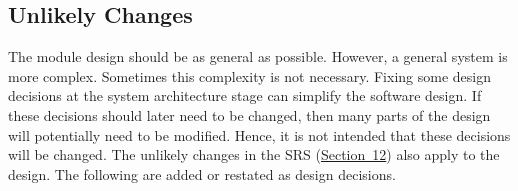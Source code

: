 \documentclass[10pt, titlepage]{article}
\newcommand{\srsurl}{https://team-hindsight.github.io/ophthamology-game/SRS/SRS.pdf}
\newcommand{\srsitemref}[2]{\href{\srsurl\#nameddest=#1}{#2}}
\begin{document}
\subsection{Unlikely Changes} \label{SecUchange}

The module design should be as general as possible. However, a general system is
more complex. Sometimes this complexity is not necessary. Fixing some design
decisions at the system architecture stage can simplify the software design. If
these decisions should later need to be changed, then many parts of the design
will potentially need to be modified. Hence, it is not intended that these
decisions will be changed. The unlikely changes in the SRS
(\srsitemref{sec_UnlikelyChanges}{Section~12}) also apply to the design.
The following are added or restated as design decisions.
\end{document}
